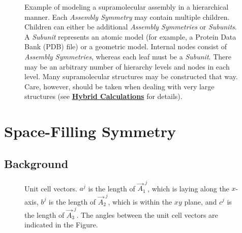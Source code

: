 \documentclass[../D+Manual.tex]{subfiles}
\begin{document}
\begin{figure}[h]
	\centering
	\caption {Example of modeling a supramolecular assembly in a hierarchical manner. Each \textit{Assembly Symmetry}  may contain multiple children. Children can either be additional \textit{Assembly Symmetries} or \textit{Subunits}. A \textit{Subunit} represents an atomic model (for example, a Protein Data Bank (PDB) file) or a geometric model. Internal nodes consist of \textit{Assembly Symmetries}, whereas each leaf must be a \textit{Subunit}.  There may be an arbitrary number of hierarchy levels and nodes in each level. Many supramolecular structures may be constructed that way. Care, however, should be taken when dealing with very large structures (see \hyperref[sec:hybrid]{\textbf{Hybrid Calculations}} for details).}
	\label{fig:hierarchical}
\end{figure}


\section{Space-Filling Symmetry}
\subsection{Background}
\begin{figure} %
	\centering
	\caption{Unit cell vectors. $a^j$ is the length of $\vec{A}^{,j}_1$, which is laying along the $x$-axis, $b^j$ is the length of $\vec{A}^{,j}_2$, which is within the $xy$ plane, and $c^j$ is the length of $\vec{A}^{,j}_3$. The angles between the unit cell vectors are indicated in the Figure.}
	\label{fig:unitcellvectors}
\end{figure}
\end{document}
